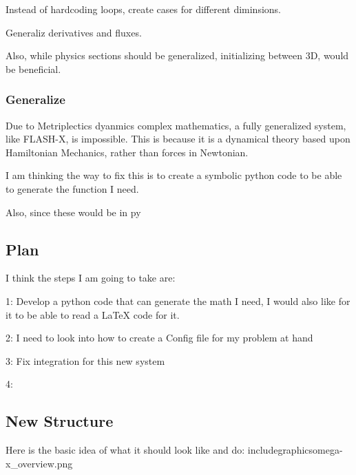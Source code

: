 Instead of hardcoding loops, create cases for different diminsions.


Generaliz derivatives and fluxes.

Also, while physics sections should be generalized, initializing between 3D, would be beneficial.
\subsubsection{Generalize}
Due to Metriplectics dyanmics complex mathematics, a fully generalized system, like FLASH-X, is impossible. This is because it is a dynamical theory based upon Hamiltonian Mechanics, rather than forces in Newtonian.

I am thinking the way to fix this is to create a symbolic python code to be able to generate the function I need.

Also, since these would be in py
\subsection{Plan}

I think the steps I am going to take are:

1: Develop a python code that can generate the math I need, I would also like for it to be able to read a LaTeX code for it.

2: I need to look into how to create a Config file for my problem at hand

3: Fix integration for this new system

4: 
\subsection{New Structure}
Here is the basic idea of what it should look like and do:
includegraphics{omega-x_overview.png}


